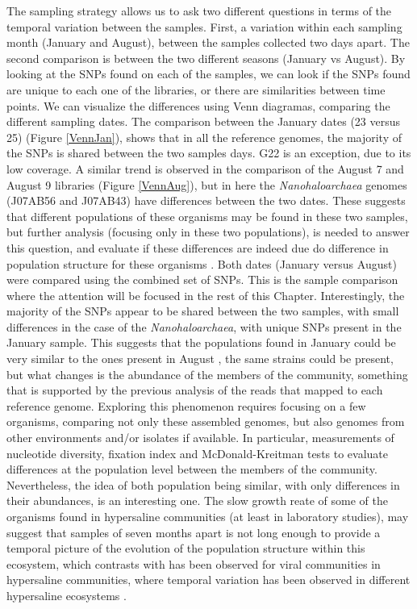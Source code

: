 The sampling strategy allows us to ask two different questions in terms of the temporal variation between the samples. First, a variation within each sampling month (January and August), between the samples collected two days apart. The second comparison is between the two different seasons (January vs August). By looking at the SNPs found on each of the samples, we can look if the SNPs found are unique to each one of the libraries, or there are similarities between time points. We can visualize the differences using Venn diagramas, comparing the different sampling dates. The comparison between the January dates (23 versus 25) (Figure \ref{VennJan}), shows that in all the reference genomes, the majority of the SNPs is shared between the two samples days. G22 is an exception, due to its low coverage. A similar trend is observed in the comparison of the August 7 and August 9 libraries (Figure \ref{VennAug}), but in here the \textit{Nanohaloarchaea} genomes (J07AB56 and J07AB43) have differences between the two dates. These suggests that different populations of these organisms may be found in these two samples, but further analysis (focusing only in these two populations), is needed to answer this question, and evaluate if these differences are indeed due do difference in population structure for these organisms \cite{Schloissnig:2012hx,Shapiro:hi,Vos:2011ux}. Both dates (January versus August) were compared using the combined set of SNPs. This is the sample comparison where the attention will be focused in the rest of this Chapter. Interestingly, the majority of the SNPs appear to be shared between the two samples, with small differences in the case of the \textit{Nanohaloarchaea}, with unique SNPs present in the January sample. This suggests that the populations found in January could be very similar to the ones present in August \cite{Doolittle:2012hf}, the same strains could be present, but what changes is the abundance of the members of the community, something that is supported by the previous analysis of the reads that mapped to each reference genome. Exploring this phenomenon requires focusing on a few organisms, comparing not only these assembled genomes, but also genomes from other environments and/or isolates if available. In particular, measurements of nucleotide diversity, fixation index and McDonald-Kreitman tests \cite{Schloissnig:2012hx,Simmons:2008by} to evaluate differences at the population level between the members of the community. Nevertheless, the idea of both population being similar, with only differences in their abundances, is an interesting one. The slow growth reate of some of the organisms found in hypersaline communities \cite{DyallSmith:2011tu} (at least in laboratory studies), may suggest that samples of seven months apart is not long enough to provide a temporal picture of the evolution of the population structure within this ecosystem, which contrasts with has been observed for viral communities in hypersaline communities, where temporal variation has been observed in different hypersaline ecosystems \cite{RodriguezBrito:2010in,Emerson:2012gh}.

